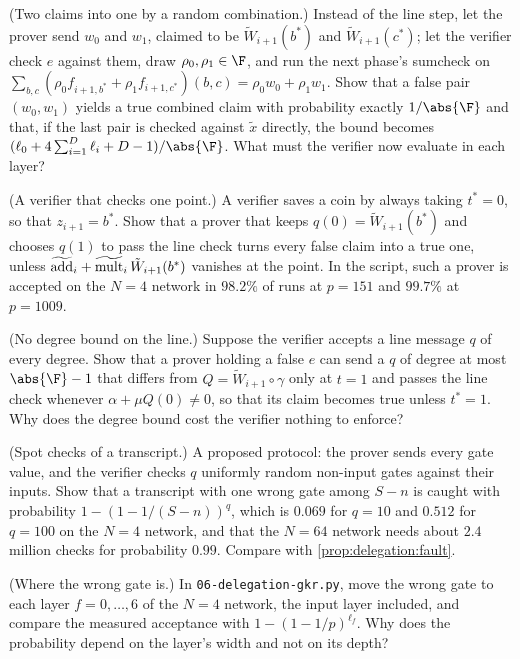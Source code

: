 \begin{refsection}
\begin{exercises}
\item \variation (Two claims into one by a random combination.) Instead of the line step, let the prover send $w_0$ and $w_1$, claimed to be $\tilde W_{i+1}(b^*)$ and $\tilde W_{i+1}(c^*)$; let the verifier check $e$ against them, draw $\rho_0,\rho_1\in\F$, and run the next phase's sumcheck on $\sum_{b,c}(\rho_0f_{i+1,b^*}+\rho_1f_{i+1,c^*})(b,c)=\rho_0w_0+\rho_1w_1$. Show that a false pair $(w_0,w_1)$ yields a true combined claim with probability exactly $1/\abs{\F}$ and that, if the last pair is checked against $\tilde x$ directly, the bound becomes $(\ell_0+4\sum_{i=1}^D\ell_i+D-1)/\abs{\F}$. What must the verifier now evaluate in each layer?\label{ex:delegation:combine}

\item \attack (A verifier that checks one point.) A verifier saves a coin by always taking $t^*=0$, so that $z_{i+1}=b^*$. Show that a prover that keeps $q(0)=\tilde W_{i+1}(b^*)$ and chooses $q(1)$ to pass the line check turns every false claim into a true one, unless $\widetilde{\mathrm{add}}_i+\widetilde{\mathrm{mult}}_i\,\tilde W_{i+1}(b^*)$ vanishes at the point. In the script, such a prover is accepted on the $N=4$ network in $98.2\%$ of runs at $p=151$ and $99.7\%$ at $p=1009$.\label{ex:delegation:onepoint}

\item \attack (No degree bound on the line.) Suppose the verifier accepts a line message $q$ of every degree. Show that a prover holding a false $e$ can send a $q$ of degree at most $\abs{\F}-1$ that differs from $Q=\tilde W_{i+1}\circ\gamma$ only at $t=1$ and passes the line check whenever $\alpha+\mu Q(0)\ne0$, so that its claim becomes true unless $t^*=1$. Why does the degree bound cost the verifier nothing to enforce?\label{ex:delegation:degree}

\item \attack (Spot checks of a transcript.) A proposed protocol: the prover sends every gate value, and the verifier checks $q$ uniformly random non-input gates against their inputs. Show that a transcript with one wrong gate among $S-n$ is caught with probability $1-(1-1/(S-n))^q$, which is $0.069$ for $q=10$ and $0.512$ for $q=100$ on the $N=4$ network, and that the $N=64$ network needs about $2.4$ million checks for probability $0.99$. Compare with \cref{prop:delegation:fault}.\label{ex:delegation:spot}

\item \simulation (Where the wrong gate is.) In \texttt{06-delegation-gkr.py}, move the wrong gate to each layer $f=0,\dots,6$ of the $N=4$ network, the input layer included, and compare the measured acceptance with $1-(1-1/p)^{\ell_f}$. Why does the probability depend on the layer's width and not on its depth?\label{ex:delegation:where}


\end{exercises}
\end{refsection}
